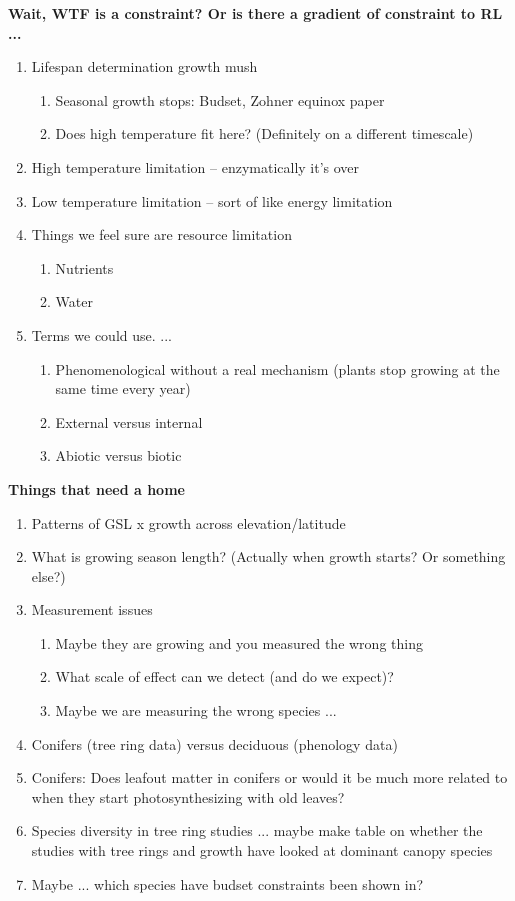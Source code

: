 \documentclass[11pt,letter]{article}
\begin{document}
{\bf Wait, WTF is a constraint? Or is there a gradient of constraint to RL ... }
\begin{enumerate}

\item Lifespan determination growth mush
\begin{enumerate}
\item Seasonal growth stops: Budset, Zohner equinox paper
\item Does high temperature fit here? (Definitely on a different timescale)
\end{enumerate}
\item High temperature limitation -- enzymatically it's over
\item Low temperature limitation -- sort of like energy limitation 
\item Things we feel sure are resource limitation
\begin{enumerate}
\item Nutrients
\item Water
\end{enumerate}
\item Terms we could use. ... 
\begin{enumerate}
\item Phenomenological without a real mechanism (plants stop growing at the same time every year)
\item External versus internal
\item Abiotic versus biotic
\end{enumerate}
\end{enumerate}


{\bf Things that need a home}
\begin{enumerate}
\item Patterns of GSL x growth across elevation/latitude
\item What is growing season length? (Actually when growth starts? Or something else?) 
\item Measurement issues
\begin{enumerate}
\item Maybe they are growing and you measured the wrong thing
\item What scale of effect can we detect (and do we expect)?
\item Maybe we are measuring the wrong species ...
\end{enumerate}
\item Conifers (tree ring data) versus deciduous (phenology data)
\item Conifers: Does leafout matter in conifers or would it be much more related to when they start photosynthesizing with old leaves?
\item Species diversity in tree ring studies ... maybe make table on whether the studies with tree rings and growth have looked at dominant canopy species 
\item Maybe ... which species have budset constraints been shown in?
\end{enumerate}
\end{document}
